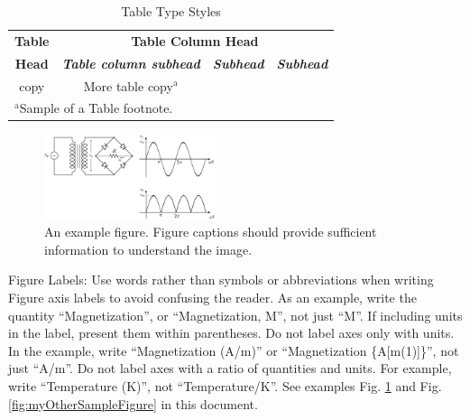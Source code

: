 \begin{table}[htbp]
	\caption{Table Type Styles}
	\begin{center}
		\begin{tabular}{|c|c|c|c|}
			\hline  
			\textbf{Table}&\multicolumn{3}{|c|}{\textbf{Table Column Head}} \\
			\cline{2-4} 
			\textbf{Head} & \textbf{\textit{Table column subhead}}& \textbf{\textit{Subhead}}& \textbf{\textit{Subhead}} \\
			\hline
			copy& More table copy$^{\mathrm{a}}$& &  \\
			\hline
			\multicolumn{4}{l}{$^{\mathrm{a}}$Sample of a Table footnote.}
		\end{tabular}
	\label{tab1}
	\end{center}
\end{table}





\begin{figure}
   \centering
   \includegraphics[width = 0.45\textwidth]{figures/21.pdf}
   \caption{An example figure. Figure captions should provide sufficient information to understand the image.}
   \label{fig:mySampleFigure}
\end{figure}


Figure Labels: Use words rather than symbols or abbreviations when writing Figure axis labels to avoid confusing the reader. As an example, write the quantity ``Magnetization'', or ``Magnetization, M'', not just ``M''. If including units in the label, present them within parentheses. Do not label axes only with units. In the example, write ``Magnetization (A/m)'' or ``Magnetization \{A[m(1)]\}'', not just ``A/m''. Do not label axes with a ratio of quantities and units. For example, write ``Temperature (K)'', not ``Temperature/K''. See examples Fig. \ref{fig:mySampleFigure} and Fig. \ref{fig:myOtherSampleFigure} in this document.

